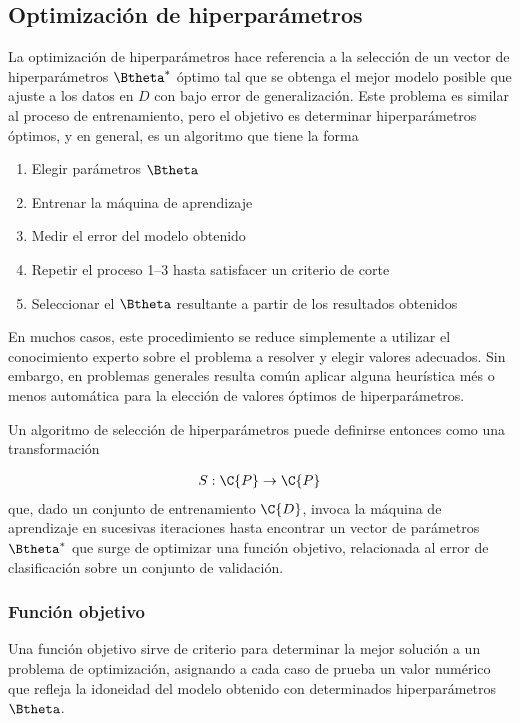 \subsection{Optimización de hiperparámetros}
La optimización de hiperparámetros hace referencia a la selección de
un vector de hiperparámetros $\Btheta^*$ óptimo tal que se obtenga el
mejor modelo posible que ajuste a los datos en $D$ con bajo error de
generalización.
Este problema es similar al proceso de entrenamiento, pero el objetivo
es determinar hiperparámetros óptimos, y en general, es un algoritmo
que tiene la forma

\begin{enumerate}
\item Elegir parámetros $\Btheta$
\item Entrenar la máquina de aprendizaje
\item Medir el error del modelo obtenido
\item Repetir el proceso 1--3 hasta satisfacer un criterio de corte
\item Seleccionar el $\Btheta$ resultante a partir de los resultados
  obtenidos
\end{enumerate}
En muchos casos, este procedimiento se reduce simplemente a utilizar
el conocimiento experto sobre el problema a resolver y elegir valores
adecuados. Sin embargo, en problemas generales resulta común aplicar
alguna heurística més o menos automática para la elección de valores
óptimos de hiperparámetros.

Un algoritmo de selección de hiperparámetros puede definirse entonces
como una transformación

\begin{align}
  S:\C{P} %
  \rightarrow\C{P}
\end{align}
que, dado un conjunto de entrenamiento $\C{D}$, invoca la máquina de aprendizaje en
sucesivas iteraciones hasta encontrar un vector de parámetros
$\Btheta^*$ que surge de optimizar una función objetivo, relacionada
al error de clasificación sobre un conjunto de validación.

\subsubsection{Función objetivo}
Una función objetivo sirve de criterio para determinar la mejor
solución a un problema de optimización, asignando a cada caso de
prueba un valor numérico que refleja la idoneidad del modelo obtenido
con determinados hiperparámetros $\Btheta$.

